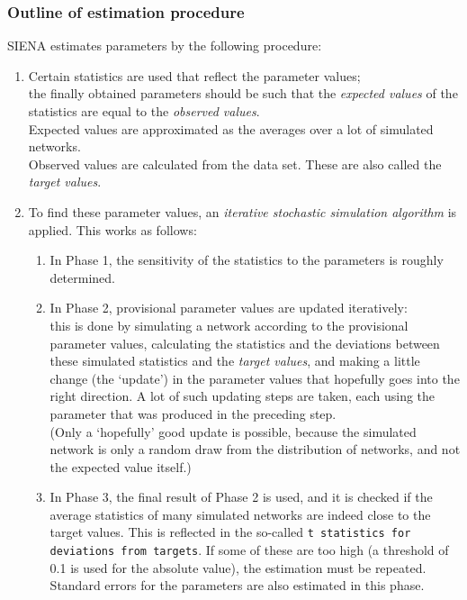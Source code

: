 \documentclass[a4paper,fleqn,11pt]{article}
\newcommand{\+}{\, + \,}
\newcommand{\SI}{{\sf SIENA }}
\begin{document}
\subsubsection{Outline of estimation procedure}
\label{S_estim}
\noindent
\SI estimates parameters by the following procedure:
\begin{enumerate}
\item  Certain statistics are used that reflect the parameter values;\\
  the finally obtained parameters should be such that the \emph{expected
    values}
  of the statistics are equal to the \emph{observed values}.\\
  Expected values are approximated as the averages over a lot of simulated
  networks.\\
  Observed values are calculated from the data set. These are also called the
  \emph{target values}.
\item To find these parameter values, an \emph{iterative stochastic simulation
    algorithm}
  is applied.
  This works as follows:
\begin{enumerate}
\item In Phase 1, the sensitivity of the statistics to the parameters is roughly
  determined.
\item In Phase 2, provisional parameter values are updated iteratively:\\
  this is done by simulating a network according to the provisional parameter
  values, calculating the statistics and the deviations between these simulated
  statistics and the \emph{target values}, and making a little change (the
  `update') in the parameter values
  that hopefully goes into the right direction. A lot of such updating steps
  are taken, each using the parameter that was produced in the preceding step.\\
  (Only a `hopefully' good update is possible, because the simulated network is
  only a random draw from the distribution of networks, and not the expected
  value itself.)
\item In Phase 3, the final result of Phase 2 is used, and it is checked if the
  average statistics of many simulated networks are indeed close to the target
  values. This is reflected in the so-called \texttt{t statistics for deviations
  from targets}. If some of these are too high (a threshold of 0.1 is
  used for the absolute value), the estimation must be repeated.
   Standard errors for the parameters are also estimated in this
  phase.
\end{enumerate}
\end{enumerate}
\end{document}
